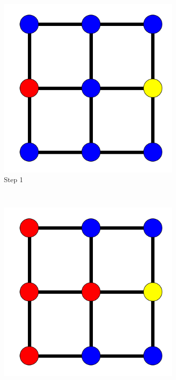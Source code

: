 \documentclass[bsc,frontabs,twoside,singlespacing,parskip,deptreport]{infthesis}     %
\begin{document}
\begin{figure}
  	\vspace{-25pt}
    \centering
    \begin{subfigure}[b]{0.23\textwidth}
        \includegraphics[width=\textwidth]{simpleProcess1}
        \caption{Step 1}
        \label{fig:simpleProcess1}
    \end{subfigure}
    ~ %
    \begin{subfigure}[b]{0.23\textwidth}
        \includegraphics[width=\textwidth]{simpleProcess2}

\end{subfigure}
\end{figure}
\end{document}
